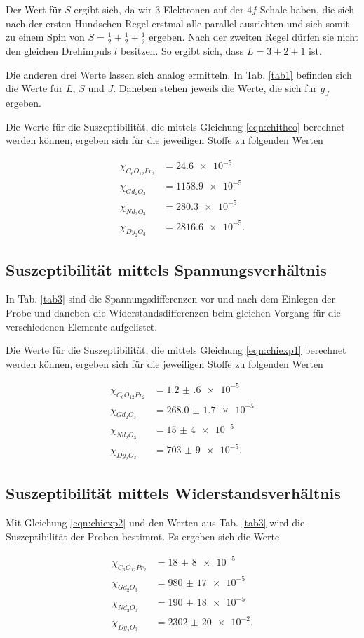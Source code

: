 \noindent Der Wert für $S$ ergibt sich, da wir \num{3} Elektronen auf der $4f$ Schale haben, die sich nach der ersten Hundschen Regel erstmal alle parallel ausrichten und sich somit zu einem Spin von $S = \frac{1}{2}+ \frac{1}{2} + \frac{1}{2}$ ergeben. Nach der zweiten Regel dürfen sie nicht den gleichen Drehimpuls $l$ besitzen. So ergibt sich, dass $L = 3 + 2 + 1$ ist. 

\noindent Die anderen drei Werte lassen sich analog ermitteln. 
In Tab. \ref{tab1} befinden sich die Werte für $L$, $S$ und $J$. Daneben stehen jeweils die Werte, die sich für 
$g_J$ ergeben. 


\noindent Die Werte für die Suszeptibilität, die mittels Gleichung \eqref{eqn:chitheo} berechnet werden können, ergeben sich für die jeweiligen Stoffe 
zu folgenden Werten 

\begin{align*} 
   \chi_{C_6 O_{12} Pr_2} &= \num{24.6e-5}\\
   \chi_{Gd_2 O_3} &= \num{1158.9e-5}\\
   \chi_{Nd_2 O_3} &= \num{280.3e-5}\\
   \chi_{Dy_2 O_3} &= \num{2816.6e-5}.
\end{align*}

\subsection{Suszeptibilität mittels Spannungsverhältnis}
In Tab. \ref{tab3} sind die Spannungsdifferenzen vor und nach dem Einlegen der Probe und daneben die Widerstandsdifferenzen beim gleichen Vorgang für die verschiedenen Elemente aufgelistet.


\noindent Die Werte für die Suszeptibilität, die mittels Gleichung \eqref{eqn:chiexp1} berechnet werden können, ergeben sich für die jeweiligen Stoffe 
zu folgenden Werten 

\begin{align*} 
   \chi_{C_6 O_{12} Pr_2} &= \num{1.2(6)e-5}\\
   \chi_{Gd_2 O_3} &= \num{268.0(17)e-5}\\
   \chi_{Nd_2 O_3} &= \num{15(4)e-5}\\
   \chi_{Dy_2 O_3} &= \num{703(9)e-5}.
\end{align*}


\subsection{Suszeptibilität mittels Widerstandsverhältnis}
Mit Gleichung \eqref{eqn:chiexp2} und den Werten aus Tab. \ref{tab3}
wird die Suszeptibilität der Proben bestimmt.
Es ergeben sich die Werte

\begin{align*} 
   \chi_{C_6 O_{12} Pr_2} &= \num{18(8)e-5}\\
   \chi_{Gd_2 O_3} &= \num{980(17)e-5}\\
   \chi_{Nd_2 O_3} &= \num{190(18)e-5}\\
   \chi_{Dy_2 O_3} &= \num{2302(20)e-2}.
\end{align*}